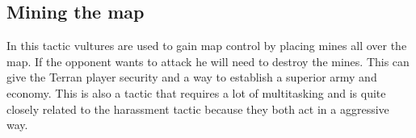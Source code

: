 	\subsection{Mining the map}
		In this tactic vultures are used to gain map control by placing mines all over the map. If the opponent wants to attack he will need to destroy the 
		mines. This can give the Terran player security and a way to establish a superior army and economy. 
		This is also a tactic that requires a lot of multitasking and is quite closely related to the harassment tactic because they both act in a 
		aggressive way.
		
	
		
		
		